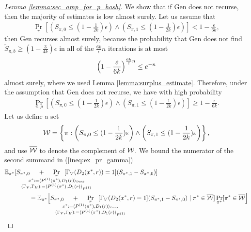 \begin{proof}[Lemma \ref{lemma:sec_amp_for_p_hash}]
We show that if Gen does not recurse, then the majority of estimates is low almost surely.
Let us assume that
\begin{align}
\underset{\pi}{\Pr}\left[\left(S_{\pi,0} \leq (1 - \frac{1}{2k})\epsilon\right) \land \left( S_{\pi,1} \leq (1-\frac{1}{2k})\epsilon\right)\right] < 1 - \frac{\epsilon}{6k},
\end{align}
then Gen recurses almost surely, because the probability that
Gen does not find $\widetilde{S}_{\pi, b} \geq (1-\frac{3}{4k})\epsilon$ in all of the $\frac{6k}{\epsilon}n$ iterations is at most
\begin{align*}
  \Bigl(1 - \frac{\epsilon}{6k}\Bigr)^{\frac{6k}{\epsilon}n} \leq e^{-n}
\end{align*}
almost surely, where we used Lemma \ref{lemma:surplus_estimate}.
Therefore, under the assumption that Gen does not recurse, we have with high probability
\begin{align}
\underset{\pi, \rho}{\Pr}\left[\left(S_{\pi,0} \leq (1 - \frac{1}{2k})\epsilon\right) \land \left( S_{\pi,1} \leq (1-\frac{1}{2k})\epsilon\right)\right] \geq 1 - \frac{\epsilon}{6k}.
\end{align}
Let us define a set
\begin{align}
  \cW = \left\{ \pi :  \left(S_{\pi,0} \leq (1 - \frac{1}{2k})\epsilon\right) \land \left( S_{\pi,1} \leq (1-\frac{1}{2k})\epsilon \right) \right\},
\end{align}
and use $\overline{\cW}$ to denote the complement of $\cW$.
We bound the numerator of the second summand in (\ref{ineq:ex_pr_gamma})
\begin{align}
  \label{ineq:second_eq}
&\mathbb{E}_{\pi^*}[ S_{\pi^*,0}
\mkern23mu
+
\mkern23mu
\underset{
  \mathclap{
  \substack{r \\ x^* := \langle P^{(1)}(\pi^*), D_1(r) \rangle_{\mathit{trans}}
    \\ (\Gamma_V, \Gamma_H) := \langle P^{(1)}(\pi^*), D_1 (r) \rangle_{P^{(1)}} }}}
{\Pr}\mkern13mu[\Gamma_V(D_2(x^*, r)) = 1]
(S_{\pi^*,1} - S_{\pi^*,0})] \notag\\
%
&\IndII = \mathbb{E}_{\pi^*}\Bigl[ S_{\pi^*,0}
\mkern23mu + \mkern23mu
\underset{
  \mathclap{
  \substack{r \\ x^* := \langle P^{(1)}(\pi^*), D_1(r) \rangle_{\mathit{trans}}
    \\ (\Gamma_V, \Gamma_H) := \langle P^{(1)}(\pi^*), D_1 (r) \rangle_{P^{(1)}} }}}
{\Pr}\mkern13mu[\Gamma_V(D_2(x^*, r) = 1]
  (S_{\pi^*,1} - S_{\pi^*,0}) \mid \pi^* \in \overline{\cW}] \Pr_{\pi^*}[\pi^* \in \overline{\cW}\Bigr]\notag\\

\end{align}
\end{proof}
